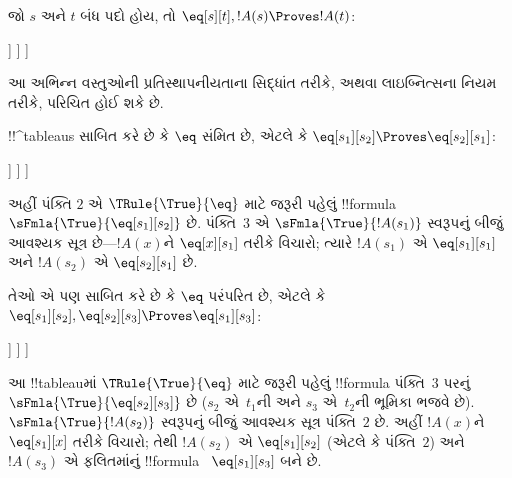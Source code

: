 \documentclass[../../../include/open-logic-section]{subfiles}
\begin{document}
\begin{ex}
જો $s$ અને $t$ બંધ પદો હોય, તો $\eq[s][t], !A(s) \Proves !A(t)$:
\begin{oltableau}
  [\sFmla{\False}{\formula{A}(t)}, just = \TAss
    [\sFmla{\True}{\eq[s][t]}, just = \TAss
      [\sFmla{\True}{\formula{A}(s)}, just = \TAss
        [\sFmla{\True}{\formula{A}(t)}, just={\TRule{\True}{\eq}[2, 3]}, close]
      ]
    ]
  ]
\end{oltableau}
આ અભિન્ન વસ્તુઓની પ્રતિસ્થાપનીયતાના સિદ્ધાંત તરીકે, અથવા લાઇબ્નિત્સના
નિયમ તરીકે, પરિચિત હોઈ શકે છે.

!!^{tableau}s સાબિત કરે છે કે $\eq$ સંમિત છે, એટલે કે
$\eq[s_1][s_2] \Proves \eq[s_2][s_1]$:
\begin{oltableau}
  [\sFmla{\False}{\eq[s_2][s_1]}, just = \TAss
    [\sFmla{\True}{\eq[s_1][s_2]}, just = \TAss
      [\sFmla{\True}{\eq[s_1][s_1]}, just = {$\eq$}
        [\sFmla{\True}{\eq[s_2][s_1]}, just = {\TRule{\True}{\eq}[2, 3]}, close]
      ]
    ]
  ]
\end{oltableau}
અહીં પંક્તિ $2$ એ $\TRule{\True}{\eq}$ માટે જરૂરી પહેલું
!!{formula}~$\sFmla{\True}{\eq[s_1][s_2]}$ છે. પંક્તિ~$3$ એ
$\sFmla{\True}{!A(s_1)}$ સ્વરૂપનું બીજું આવશ્યક સૂત્ર છે---$!A(x)$ને
$\eq[x][s_1]$ તરીકે વિચારો; ત્યારે $!A(s_1)$ એ $\eq[s_1][s_1]$ અને
$!A(s_2)$ એ $\eq[s_2][s_1]$ છે.

તેઓ એ પણ સાબિત કરે છે કે $\eq$ પરંપરિત છે, એટલે કે
$\eq[s_1][s_2], \eq[s_2][s_3] \Proves \eq[s_1][s_3]$:
\begin{oltableau}
  [\sFmla{\False}{\eq[s_1][s_3]}, just = \TAss
    [\sFmla{\True}{\eq[s_1][s_2]}, just = \TAss
      [\sFmla{\True}{\eq[s_2][s_3]}, just = \TAss
        [\sFmla{\True}{\eq[s_1][s_3]}, just = {\TRule{\True}{\eq}[3, 2]}, close]
      ]
    ]
  ]
\end{oltableau}
આ !!{tableau}માં $\TRule{\True}{\eq}$ માટે જરૂરી પહેલું !!{formula}
પંક્તિ~$3$ પરનું $\sFmla{\True}{\eq[s_2][s_3]}$ છે ($s_2$ એ~$t_1$ની
અને $s_3$ એ~$t_2$ની ભૂમિકા ભજવે છે). $\sFmla{\True}{!A(s_2)}$
સ્વરૂપનું બીજું આવશ્યક સૂત્ર પંક્તિ~$2$ છે. અહીં $!A(x)$ને
$\eq[s_1][x]$ તરીકે વિચારો; તેથી $!A(s_2)$ એ $\eq[s_1][s_2]$ (એટલે
કે પંક્તિ~$2$) અને $!A(s_3)$ એ ફલિતમાંનું !!{formula}
~$\eq[s_1][s_3]$ બને છે.
\end{ex}
\end{document}
